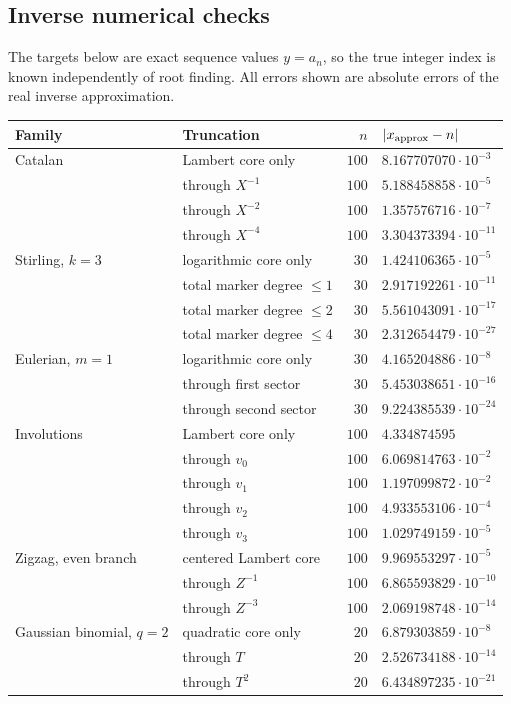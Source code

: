\documentclass[11pt,a4paper]{article}
\theoremstyle{definition}
\theoremstyle{remark}
\numberwithin{equation}{section}
\begin{document}
\subsection{Inverse numerical checks}
The targets below are exact sequence values $y=a_n$, so the true integer index is known independently of root finding. All errors shown are absolute errors of the real inverse approximation.
\begin{center}
\small
\begin{tabular}{@{}llrl@{}}
\toprule
Family & Truncation & $n$ & $|x_{\rm approx}-n|$\\
\midrule
Catalan & Lambert core only & $100$ & $8.167707070\cdot10^{-3}$\\
 & through $X^{-1}$ & $100$ & $5.188458858\cdot10^{-5}$\\
 & through $X^{-2}$ & $100$ & $1.357576716\cdot10^{-7}$\\
 & through $X^{-4}$ & $100$ & $3.304373394\cdot10^{-11}$\\
\addlinespace
Stirling, $k=3$ & logarithmic core only & $30$ & $1.424106365\cdot10^{-5}$\\
 & total marker degree $\le1$ & $30$ & $2.917192261\cdot10^{-11}$\\
 & total marker degree $\le2$ & $30$ & $5.561043091\cdot10^{-17}$\\
 & total marker degree $\le4$ & $30$ & $2.312654479\cdot10^{-27}$\\
\addlinespace
Eulerian, $m=1$ & logarithmic core only & $30$ & $4.165204886\cdot10^{-8}$\\
 & through first sector & $30$ & $5.453038651\cdot10^{-16}$\\
 & through second sector & $30$ & $9.224385539\cdot10^{-24}$\\
\addlinespace
Involutions & Lambert core only & $100$ & $4.334874595$\\
 & through $v_0$ & $100$ & $6.069814763\cdot10^{-2}$\\
 & through $v_1$ & $100$ & $1.197099872\cdot10^{-2}$\\
 & through $v_2$ & $100$ & $4.933553106\cdot10^{-4}$\\
 & through $v_3$ & $100$ & $1.029749159\cdot10^{-5}$\\
\addlinespace
Zigzag, even branch & centered Lambert core & $100$ & $9.969553297\cdot10^{-5}$\\
 & through $Z^{-1}$ & $100$ & $6.865593829\cdot10^{-10}$\\
 & through $Z^{-3}$ & $100$ & $2.069198748\cdot10^{-14}$\\
\addlinespace
Gaussian binomial, $q=2$ & quadratic core only & $20$ & $6.879303859\cdot10^{-8}$\\
 & through $T$ & $20$ & $2.526734188\cdot10^{-14}$\\
 & through $T^2$ & $20$ & $6.434897235\cdot10^{-21}$\\
\bottomrule
\end{tabular}
\end{center}
\end{document}
